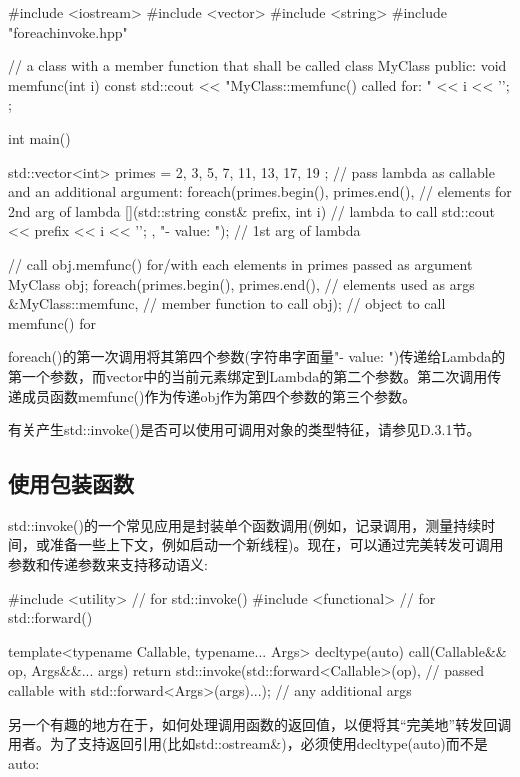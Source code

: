 \begin{cpp}
#include <iostream>
#include <vector>
#include <string>
#include "foreachinvoke.hpp"

// a class with a member function that shall be called
class MyClass {
	public:
	void memfunc(int i) const {
		std::cout << "MyClass::memfunc() called for: " << i << '\n';
	}
};

int main()
{
	std::vector<int> primes = { 2, 3, 5, 7, 11, 13, 17, 19 };
	// pass lambda as callable and an additional argument:
	foreach(primes.begin(), primes.end(), // elements for 2nd arg of lambda
			[](std::string const& prefix, int i) { // lambda to call
				std::cout << prefix << i << '\n';
			},
			"- value: "); // 1st arg of lambda

	// call obj.memfunc() for/with each elements in primes passed as argument
	MyClass obj;
	foreach(primes.begin(), primes.end(), // elements used as args
			&MyClass::memfunc, // member function to call
			obj); // object to call memfunc() for
}
\end{cpp}

foreach()的第一次调用将其第四个参数(字符串字面量"- value: ")传递给Lambda的第一个参数，而vector中的当前元素绑定到Lambda的第二个参数。第二次调用传递成员函数memfunc()作为传递obj作为第四个参数的第三个参数。

有关产生std::invoke()是否可以使用可调用对象的类型特征，请参见D.3.1节。

\subsection{使用包装函数}

std::invoke()的一个常见应用是封装单个函数调用(例如，记录调用，测量持续时间，或准备一些上下文，例如启动一个新线程)。现在，可以通过完美转发可调用参数和传递参数来支持移动语义:

\begin{cpp}
#include <utility> // for std::invoke()
#include <functional> // for std::forward()

template<typename Callable, typename... Args>
decltype(auto) call(Callable&& op, Args&&... args)
{
	return std::invoke(std::forward<Callable>(op), // passed callable with
					   std::forward<Args>(args)...); // any additional args
}
\end{cpp}

另一个有趣的地方在于，如何处理调用函数的返回值，以便将其“完美地”转发回调用者。为了支持返回引用(比如std::ostream\&)，必须使用decltype(auto)而不是auto:

